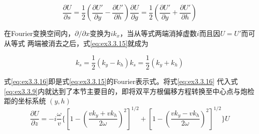 \begin{subequations}
\begin{equation}
\frac{\partial U}{\partial s}=\frac{1}{2}(\frac{\partial U'}{\partial y}-\frac{\partial U'}{\partial h})
\label{eq:ex3.3.15a}
\end{equation}
\begin{equation}
\frac{\partial U}{\partial g}=\frac{1}{2}(\frac{\partial U'}{\partial y}+\frac{\partial U'}{\partial h})
\label{eq:ex3.3.15b}
\end{equation}
\label{eq:ex3.3.15}
\end{subequations}

在Fourier变换空间内，$\partial/\partial x$变换为$ik_x$，当从等式两端消掉虚数$i$而且因$U=U'$而可从等式
两端被消去之后，式\ref{eq:ex3.3.15}就成为

\begin{subequations}
\begin{equation}
k_s=\frac{1}{2}(k_y-k_h)
\label{eq:ex3.3.16a}
\end{equation}
\begin{equation}
k_s=\frac{1}{2}(k_y+k_h)
\label{eq:ex3.3.16b}
\end{equation}
\label{eq:ex3.3.16}
\end{subequations}

式\ref{eq:ex3.3.16}即是式\ref{eq:ex3.3.15}的Fourier表示式。将式\ref{eq:ex3.3.16}
代入式\ref{eq:ex3.3.9}内就达到了本节主要目的，即将双平方根偏移方程转换至中心点与炮检距的坐标系统
$(y,h)$
\begin{equation}
\frac{\partial U}{\partial z}=-i\frac{\omega}{v} \{
[1-(\frac{vk_y+vk_h}{2\omega})^2]^{1/2}+
[1-(\frac{vk_y-vk_h}{2\omega})^2]^{1/2}
\}U
\label{eq:ex3.3.17}
\end{equation}
